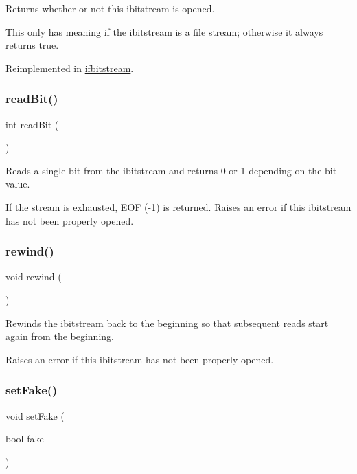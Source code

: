 Returns whether or not this ibitstream is opened. 

This only has meaning if the ibitstream is a file stream; otherwise it always returns true. 

Reimplemented in \mbox{\hyperlink{classifbitstream_a2f57f54d8c03b615bb31eee091d8a88a}{ifbitstream}}.

\mbox{\label{classibitstream_aa8c615fa7957fb0232a0873dadbd39e8}} 
\subsubsection{\texorpdfstring{read\+Bit()}{readBit()}}
{\footnotesize\ttfamily int read\+Bit (\begin{DoxyParamCaption}{ }\end{DoxyParamCaption})}



Reads a single bit from the ibitstream and returns 0 or 1 depending on the bit value. 

If the stream is exhausted, E\+OF (-\/1) is returned. Raises an error if this ibitstream has not been properly opened. \mbox{\label{classibitstream_ab8734e666421c9fe3b6380a818c6c727}} 
\subsubsection{\texorpdfstring{rewind()}{rewind()}}
{\footnotesize\ttfamily void rewind (\begin{DoxyParamCaption}{ }\end{DoxyParamCaption})}



Rewinds the ibitstream back to the beginning so that subsequent reads start again from the beginning. 

Raises an error if this ibitstream has not been properly opened. \mbox{\label{classibitstream_ad916b4624eb09d375514964f867b475c}} 
\subsubsection{\texorpdfstring{set\+Fake()}{setFake()}}
{\footnotesize\ttfamily void set\+Fake (\begin{DoxyParamCaption}\item[{bool}]{fake }\end{DoxyParamCaption})}



